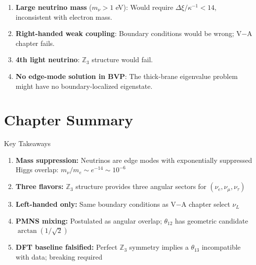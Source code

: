 \begin{tcolorbox}[edcCanonical, title=\textbf{What Would Falsify the Edge-Mode Picture}]
\begin{enumerate}
\item \textbf{Large neutrino mass} ($m_\nu > 1$ eV):
      Would require $\Delta\xi/\kappa^{-1} < 14$, inconsistent with electron mass.

\item \textbf{Right-handed weak coupling}:
      Boundary conditions would be wrong; V$-$A chapter fails.

\item \textbf{4th light neutrino}:
      $\mathbb{Z}_3$ structure would fail.

\item \textbf{No edge-mode solution in BVP}:
      The thick-brane eigenvalue problem might have no boundary-localized eigenstate.
\end{enumerate}
\end{tcolorbox}

\section{Chapter Summary}
\label{sec:nu_summary}

\begin{statusbox}{Key Takeaways}
\begin{enumerate}
\item \textbf{Mass suppression:} Neutrinos are edge modes with exponentially
      suppressed Higgs overlap: $m_\nu/m_e \sim e^{-14} \sim 10^{-6}$ \tagI{}

\item \textbf{Three flavors:} $\mathbb{Z}_3$ structure provides three angular
      sectors for $(\nu_e, \nu_\mu, \nu_\tau)$ \tagI{}

\item \textbf{Left-handed only:} Same boundary conditions as V$-$A chapter
      select $\nu_L$ \tagDc{}

\item \textbf{PMNS mixing:} Postulated as angular overlap; $\theta_{12}$ has
      geometric candidate $\arctan(1/\sqrt{2})$ \tagDcApprox{}

\item \textbf{DFT baseline falsified:} Perfect $\mathbb{Z}_3$ symmetry \tagDerSym{}
      implies a $\theta_{13}$ incompatible with data; breaking required
\end{enumerate}
\end{statusbox}

